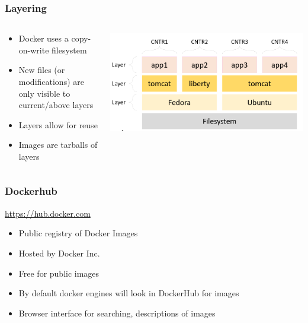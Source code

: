 \documentclass[aspectratio=169,11pt,hyperref={colorlinks=true}]{beamer}
\begin{document}
\begin{frame}
    \frametitle{Layering}
    \begin{columns}[T]
    \begin{column}{.48\textwidth}
        \begin{itemize}
            \item Docker uses a copy-on-write filesystem
            \item New files (or modifications) are only visible to current/above layers
            \item Layers allow for reuse
            \item Images are tarballs of layers
        \end{itemize}
    \end{column}
    \begin{column}{.48\textwidth}
        \centering
        \includegraphics[width=\textwidth]{layering.png}
    \end{column}
    \end{columns}
\end{frame}

\begin{frame}
    \frametitle{Dockerhub}
    \href{https:/hub.docker.com}{https://hub.docker.com}
    \begin{itemize}
        \item Public registry of Docker Images
        \item Hosted by Docker Inc.
        \item Free for public images
        \item By default docker engines will look in DockerHub for images
        \item Browser interface for searching, descriptions of images
    \end{itemize}
\end{frame}
\end{document}
